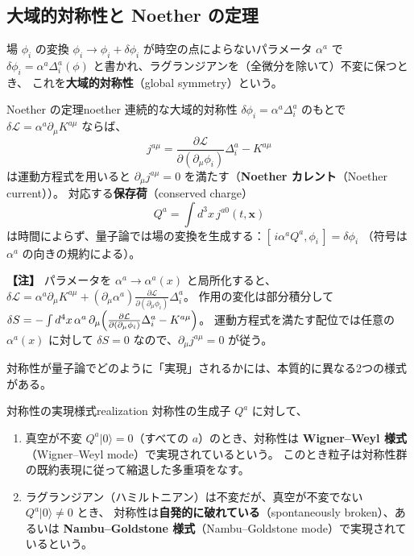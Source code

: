 \documentclass[uplatex,dvipdfmx,a4paper,11pt,openany]{jsbook}
\newcommand{\term}[2]{\textbf{#1}（#2）}
\newenvironment{note}{\vspace{1ex}\par\footnotesize\noindent\textbf{【注】}}{\par\vspace{1ex}}
\numberwithin{equation}{chapter}
\theoremstyle{definition}
\theoremstyle{plain}
\theoremstyle{remark}
\newcommand{\Lag}{\mathcal{L}}
\begin{document}
\subsection{大域的対称性と Noether の定理}
場 $\phi_i$ の変換 $\phi_i\to\phi_i+\delta\phi_i$ が時空の点によらないパラメータ $\alpha^a$ で
$\delta\phi_i=\alpha^a\Delta^a_i(\phi)$ と書かれ、ラグランジアンを（全微分を除いて）不変に保つとき、
これを\term{大域的対称性}{global symmetry}という。
\begin{myprop}{Noether の定理}{noether}
連続的な大域的対称性 $\delta\phi_i=\alpha^a\Delta^a_i$ のもとで $\delta\Lag=\alpha^a\partial_\mu K^{a\mu}$ ならば、
\begin{equation}
j^{a\mu}=\frac{\partial\Lag}{\partial(\partial_\mu\phi_i)}\Delta^a_i-K^{a\mu}
\label{eq:noether-current}
\end{equation}
は運動方程式を用いると $\partial_\mu j^{a\mu}=0$ を満たす（\term{Noether カレント}{Noether current}）。
対応する\term{保存荷}{conserved charge}
\begin{equation}
Q^a=\int d^3x\,j^{a0}(t,\bm x)
\end{equation}
は時間によらず、量子論では場の変換を生成する：$[\,i\alpha^aQ^a,\phi_i\,]=\delta\phi_i$
（符号は $\alpha^a$ の向きの規約による）。
\end{myprop}
\begin{note}
パラメータを $\alpha^a\to\alpha^a(x)$ と局所化すると、
$\delta\Lag=\alpha^a\partial_\mu K^{a\mu}+(\partial_\mu\alpha^a)\frac{\partial\Lag}{\partial(\partial_\mu\phi_i)}\Delta^a_i$。
作用の変化は部分積分して $\delta S=-\int d^4x\,\alpha^a\,\partial_\mu\Bigl(\frac{\partial\Lag}{\partial(\partial_\mu\phi_i)}\Delta^a_i-K^{a\mu}\Bigr)$。
運動方程式を満たす配位では任意の $\alpha^a(x)$ に対して $\delta S=0$ なので、$\partial_\mu j^{a\mu}=0$ が従う。
\end{note}
対称性が量子論でどのように「実現」されるかには、本質的に異なる2つの様式がある。
\begin{mydef}{対称性の実現様式}{realization}
対称性の生成子 $Q^a$ に対して、
\begin{enumerate}
    \item 真空が不変 $Q^a|0\rangle=0$（すべての $a$）のとき、対称性は
    \term{Wigner--Weyl 様式}{Wigner--Weyl mode}で実現されているという。
    このとき粒子は対称性群の既約表現に従って縮退した多重項をなす。
    \item ラグランジアン（ハミルトニアン）は不変だが、真空が不変でない $Q^a|0\rangle\ne0$ とき、
    対称性は\term{自発的に破れている}{spontaneously broken}、あるいは
    \term{Nambu--Goldstone 様式}{Nambu--Goldstone mode}で実現されているという。
\end{enumerate}
\end{mydef}
\end{document}

